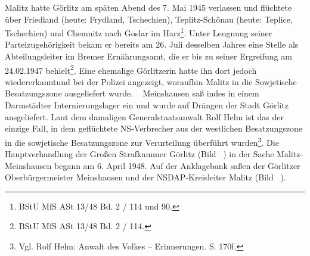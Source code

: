 \documentclass[a4paper,12pt,ngerman,
]{nisebook}
\begin{document}

Malitz hatte Görlitz am späten Abend des 7. Mai 1945 verlassen und flüchtete über Friedland (heute: Frydland, Tschechien), Teplitz-Schönau (heute: Teplice, Tschechien) und Chemnitz nach Goslar im Harz\footnote{BStU MfS ASt 13/48 Bd. 2 / 114 und 90.}. Unter Leugnung seiner Parteizugehörigkeit bekam er bereits am 26. Juli desselben Jahres eine Stelle als Abteilungsleiter im Bremer Ernährungsamt, die er bis zu seiner Ergreifung am 24.02.1947 behielt\footnote{BStU MfS ASt 13/48 Bd. 2 / 114.}. Eine ehemalige Görlitzerin hatte ihn dort jedoch wiedererkannt\linebreak\newpage und bei der Polizei angezeigt, woraufhin Malitz in die Sowjetische Besatzungszone ausgeliefert wurde. 
~\newline
Meinshausen saß indes in einem Darmstädter Internierungslager ein und wurde auf Drängen der Stadt Görlitz ausgeliefert. Laut dem damaligen Generalstaatsanwalt Rolf Helm ist das der einzige Fall, in dem geflüchtete NS-Verbrecher aus der westlichen Besatzungszone in die sowjetische Besatzungszone zur Verurteilung überführt wurden\footnote{Vgl. Rolf Helm: Anwalt des Volkes -- Erinnerungen. S. 170f.}.
\newline
Die Hauptverhandlung der Großen Strafkammer Görlitz (Bild ~) in der Sache Malitz-Meinshausen begann am 6. April 1948. Auf der Anklagebank saßen der Görlitzer Oberbürgermeister Meinshausen und der NSDAP-Kreisleiter Malitz (Bild ~).
\end{document}
